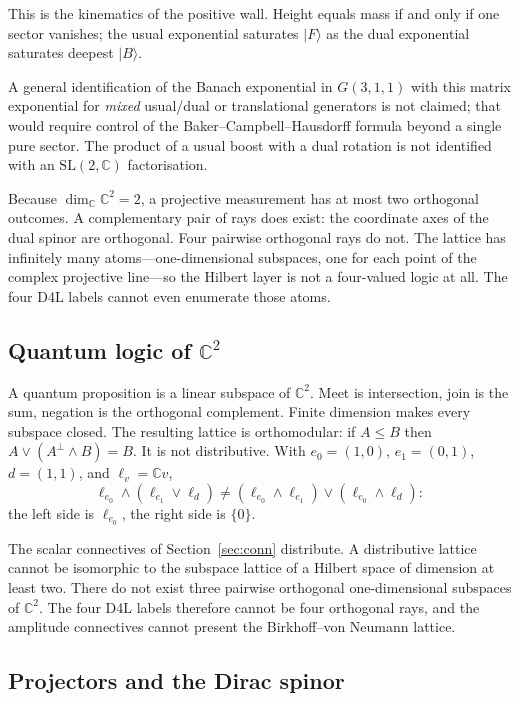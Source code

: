 \documentclass[a4paper]{article}
\theoremstyle{definition}
\begin{document}
This is the kinematics of the positive wall. Height equals mass if and
only if one sector vanishes; the usual exponential saturates
\(\lvert F\rangle\) as the dual exponential saturates deepest
\(\lvert B\rangle\).

A general identification of the Banach exponential in \(G(3,1,1)\) with
this matrix exponential for \emph{mixed} usual/dual or translational
generators is not claimed; that would require control of the
Baker--Campbell--Hausdorff formula beyond a single pure sector. The
product of a usual boost with a dual rotation is not identified with an
\(\mathrm{SL}(2,\mathbb{C})\) factorisation.

Because \(\dim_{\mathbb{C}}\mathbb{C}^2=2\), a projective measurement
has at most two orthogonal outcomes. A complementary pair of rays does
exist: the coordinate axes of the dual spinor are orthogonal. Four
pairwise orthogonal rays do not. The lattice has infinitely many
atoms---one-dimensional subspaces, one for each point of the complex
projective line---so the Hilbert layer is not a four-valued logic at
all. The four D4L labels cannot even enumerate those atoms.

\subsection[Quantum logic of C2]{Quantum logic of \(\mathbb{C}^2\)}
\label{sec:ql}

A quantum proposition is a linear subspace of \(\mathbb{C}^2\). Meet is
intersection, join is the sum, negation is the orthogonal complement.
Finite dimension makes every subspace closed. The resulting lattice is
orthomodular: if \(A\le B\) then \(A\vee(A^\perp\wedge B)=B\). It is not
distributive. With \(e_0=(1,0)\), \(e_1=(0,1)\), \(d=(1,1)\), and
\(\ell_v=\mathbb{C}v\),
\[
\ell_{e_0}\wedge(\ell_{e_1}\vee\ell_d)
\neq
(\ell_{e_0}\wedge\ell_{e_1})\vee(\ell_{e_0}\wedge\ell_d):
\]
the left side is \(\ell_{e_0}\), the right side is \(\{0\}\).

The scalar connectives of Section~\ref{sec:conn} distribute. A
distributive lattice cannot be isomorphic to the subspace lattice of a
Hilbert space of dimension at least two. There do not exist three
pairwise orthogonal one-dimensional subspaces of \(\mathbb{C}^2\). The
four D4L labels therefore cannot be four orthogonal rays, and the
amplitude connectives cannot present the Birkhoff--von Neumann lattice.

\subsection{Projectors and the Dirac spinor}
\label{sec:proj}
\end{document}
